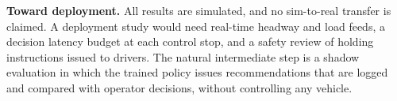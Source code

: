 \textbf{Toward deployment.} All results are simulated, and no sim-to-real transfer is claimed. A
deployment study would need real-time headway and load feeds, a decision latency budget at each control
stop, and a safety review of holding instructions issued to drivers. The natural intermediate step is a
shadow evaluation in which the trained policy issues recommendations that are logged and compared with
operator decisions, without controlling any vehicle.
